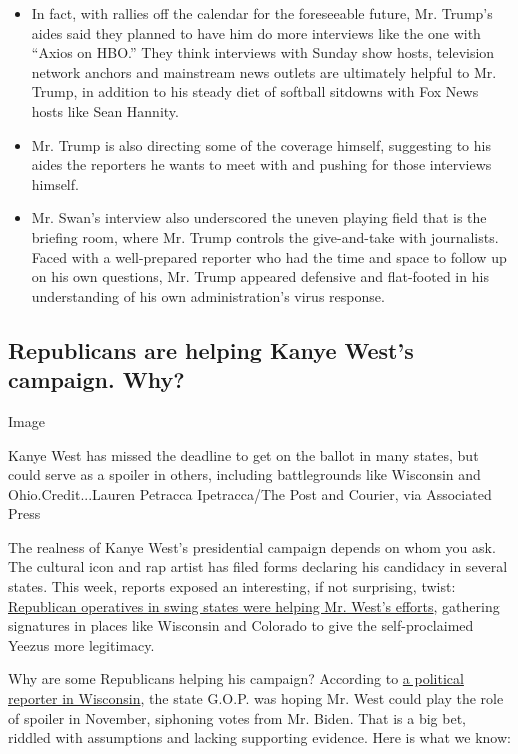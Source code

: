 \begin{itemize}
\item
  In fact, with rallies off the calendar for the foreseeable future, Mr.
  Trump's aides said they planned to have him do more interviews like
  the one with ``Axios on HBO.'' They think interviews with Sunday show
  hosts, television network anchors and mainstream news outlets are
  ultimately helpful to Mr. Trump, in addition to his steady diet of
  softball sitdowns with Fox News hosts like Sean Hannity.
\item
  Mr. Trump is also directing some of the coverage himself, suggesting
  to his aides the reporters he wants to meet with and pushing for those
  interviews himself.
\item
  Mr. Swan's interview also underscored the uneven playing field that is
  the briefing room, where Mr. Trump controls the give-and-take with
  journalists. Faced with a well-prepared reporter who had the time and
  space to follow up on his own questions, Mr. Trump appeared defensive
  and flat-footed in his understanding of his own administration's virus
  response.
\end{itemize}

\hypertarget{republicans-are-helping-kanye-wests-campaign-why}{%
\subsection{Republicans are helping Kanye West's campaign.
Why?}\label{republicans-are-helping-kanye-wests-campaign-why}}

Image

Kanye West has missed the deadline to get on the ballot in many states,
but could serve as a spoiler in others, including battlegrounds like
Wisconsin and Ohio.Credit...Lauren Petracca Ipetracca/The Post and
Courier, via Associated Press

The realness of Kanye West's presidential campaign depends on whom you
ask. The cultural icon and rap artist has filed forms declaring his
candidacy in several states. This week, reports exposed an interesting,
if not surprising, twist:
\href{https://www.nytimes.com/2020/08/04/us/politics/kanye-west-president-republicans.html}{Republican
operatives in swing states were helping Mr. West's efforts}, gathering
signatures in places like Wisconsin and Colorado to give the
self-proclaimed Yeezus more legitimacy.

Why are some Republicans helping his campaign? According to
\href{https://twitter.com/patrickdmarley/status/1291029714950389760?s=20}{a
political reporter in Wisconsin}, the state G.O.P. was hoping Mr. West
could play the role of spoiler in November, siphoning votes from Mr.
Biden. That is a big bet, riddled with assumptions and lacking
supporting evidence. Here is what we know:

